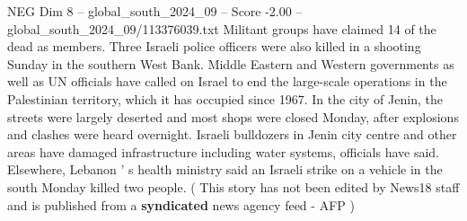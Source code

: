 \begin{textsample}{NEG Dim 8 – global\_south\_2024\_09 – Score -2.00 – global\_south\_2024\_09/113376039.txt}
Militant groups have claimed 14 of the dead as members.
Three Israeli police officers were also killed in a shooting Sunday in the southern West Bank.
Middle Eastern and Western governments as well as UN officials have called on Israel to end the large-scale operations in the Palestinian territory, which it has occupied since 1967.
In the city of Jenin, the streets were largely deserted and most shops were closed Monday, after explosions and clashes were heard overnight.
Israeli bulldozers in Jenin city centre and other areas have damaged infrastructure including water systems, officials have said.
Elsewhere, Lebanon ' s health ministry said an Israeli strike on a vehicle in the south Monday killed two people. ( This story has not been edited by News18 staff and is published from a \textbf{syndicated} news agency feed - AFP )

\end{textsample}
